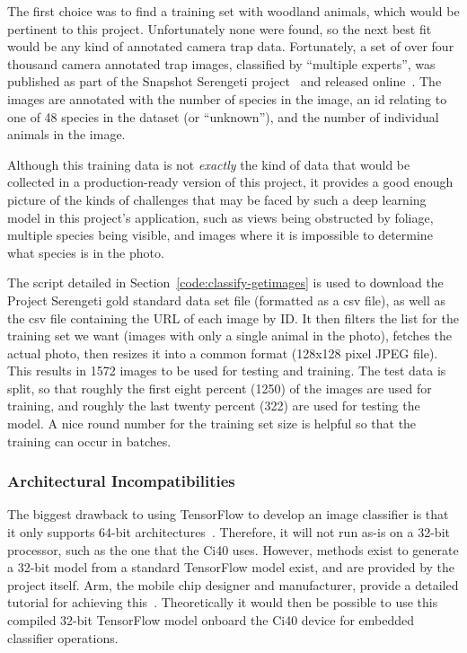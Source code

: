 The first choice was to find a training set with woodland animals, which
would be pertinent to this project. Unfortunately none were found, so the
next best fit would be any kind of annotated camera trap data. Fortunately, a
set of over four thousand camera annotated trap images, classified by
``multiple experts'', was published as part of the Snapshot Serengeti
project~\cite{swanson2015snapshot} and released
online~\cite{swanson2015data}. The images are annotated with the number of
species in the image, an id relating to one of 48 species in the dataset (or
``unknown''), and the number of individual animals in the image.

Although this training data is not \textit{exactly} the kind of data that
would be collected in a production-ready version of this project, it provides
a good enough picture of the kinds of challenges that may be faced by such a
deep learning model in this project's application, such as views being
obstructed by foliage, multiple species being visible, and images where it is
impossible to determine what species is in the photo.

The script detailed in Section~\ref{code:classify-getimages} is used to
download the Project Serengeti gold standard data set file (formatted as a
\acrshort{csv} file), as well as the \acrshort{csv} file containing the URL
of each image by ID. It then filters the list for the training set we want
(images with only a single animal in the photo), fetches the actual photo,
then resizes it into a common format (128x128 pixel JPEG file). This results
in 1572 images to be used for testing and training. The test data is split,
so that roughly the first eight percent (1250) of the images are used for
training, and roughly the last twenty percent (322) are used for testing the
model. A nice round number for the training set size is helpful so that the
training can occur in batches.

\subsubsection{Architectural Incompatibilities}
The biggest drawback to using TensorFlow to develop an image classifier is
that it only supports 64-bit architectures~\cite{tensorflow-sysreq}.
Therefore, it will not run as-is on a 32-bit processor, such as the one that
the Ci40 uses. However, methods exist to generate a 32-bit model from a
standard TensorFlow model exist, and are provided by the project itself. Arm,
the mobile chip designer and manufacturer, provide a detailed tutorial for
achieving this~\cite{arm-tensorflow32bit}. Theoretically it would then be
possible to use this compiled 32-bit TensorFlow model onboard the Ci40 device
for embedded classifier operations.

